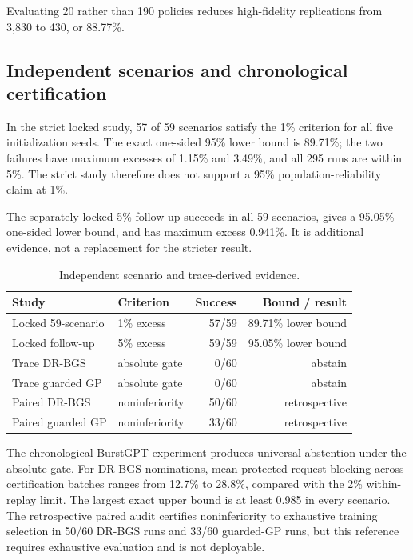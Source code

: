 \documentclass[futureinternet,article,submit,moreauthors]{Definitions/mdpi}
\begin{document}
Evaluating 20 rather than 190 policies reduces high-fidelity replications from 3,830 to 430, or 88.77\%.

\subsection{Independent scenarios and chronological certification}

In the strict locked study, 57 of 59 scenarios satisfy the 1\% criterion for all five initialization seeds. The exact one-sided 95\% lower bound is 89.71\%; the two failures have maximum excesses of 1.15\% and 3.49\%, and all 295 runs are within 5\%. The strict study therefore does not support a 95\% population-reliability claim at 1\%.

The separately locked 5\% follow-up succeeds in all 59 scenarios, gives a 95.05\% one-sided lower bound, and has maximum excess 0.941\%. It is additional evidence, not a replacement for the stricter result.

\begin{table}[t]
\centering
\small
\caption{Independent scenario and trace-derived evidence.}
\label{tab:evidence}
\begin{tabular}{llrr}
\toprule
Study & Criterion & Success & Bound / result\\
\midrule
Locked 59-scenario & 1\% excess & 57/59 & 89.71\% lower bound\\
Locked follow-up & 5\% excess & 59/59 & 95.05\% lower bound\\
Trace DR-BGS & absolute gate & 0/60 & abstain\\
Trace guarded GP & absolute gate & 0/60 & abstain\\
Paired DR-BGS & noninferiority & 50/60 & retrospective\\
Paired guarded GP & noninferiority & 33/60 & retrospective\\
\bottomrule
\end{tabular}
\end{table}

The chronological BurstGPT experiment produces universal abstention under the absolute gate. For DR-BGS nominations, mean protected-request blocking across certification batches ranges from 12.7\% to 28.8\%, compared with the 2\% within-replay limit. The largest exact upper bound is at least 0.985 in every scenario. The retrospective paired audit certifies noninferiority to exhaustive training selection in 50/60 DR-BGS runs and 33/60 guarded-GP runs, but this reference requires exhaustive evaluation and is not deployable.
\end{document}
